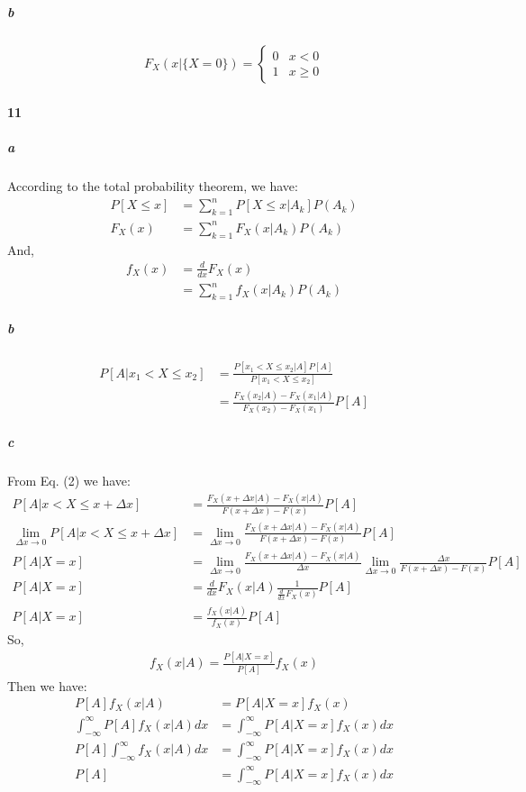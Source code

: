 \documentclass[22pt]{article}
\begin{document}
			\subparagraph{b}
			\begin{align}
				F_X(x|\{X=0\}) = 
				\begin{cases}
				0 & x< 0\\
				1 & x\geq0
				\end{cases}
			\end{align}

		\paragraph{11}
			\subparagraph{a} According to the total probability theorem, we have:
			\begin{align}
			P[X\leq x] & = \sum_{k=1}^{n}P[X\leq x|A_k]P(A_k)\\
			F_X(x) & = \sum_{k=1}^{n}F_X(x|A_k)P(A_k)
			\end{align}
			And, 
			\begin{align}
			f_X(x) &= \frac{d}{dx}F_X(x)\\
			& = \sum_{k=1}^{n}f_X(x|A_k)P(A_k)
			\end{align}

			\subparagraph{b}
			\begin{align}
			P[A|x_1<X\leq x_2] & = \frac{P[x_1<X\leq x_2|A]P[A]}{P[x_1<X\leq x_2]}\\
			& = \frac{F_X(x_2|A)-F_X(x_1|A)}{F_X(x_2)-F_X(x_1)}P[A]
			\end{align}

			\subparagraph{c}From Eq. (2) we have:
			\begin{align}
			P[A|x<X\leq x+\Delta x] &=\frac{F_X(x+\Delta x|A)-F_X(x|A)}{F(x+\Delta x)-F(x)}P[A] \\
			\lim_{\Delta x \rightarrow 0} P[A|x<X\leq x+\Delta x]& =\lim_{\Delta x \rightarrow 0} \frac{F_X(x+\Delta x|A)-F_X(x|A)}{F(x+\Delta x)-F(x)}P[A] \\
			P[A|X=x] & = \lim_{\Delta x \rightarrow 0}  \frac{F_X(x+\Delta x|A)-F_X(x|A)}{\Delta x}\lim_{\Delta x \rightarrow 0}\frac{\Delta x}{F(x+\Delta x)-F(x)}P[A]\\
			P[A|X=x] & = \frac{d}{dx} F_X(x|A)\frac{1}{\frac{d}{dx}F_X(x)}P[A]\\
			P[A|X=x] & = \frac{f_X(x|A)}{f_X(x)}P[A]
			\end{align}
			So, 
			\begin{align}
			f_X(x|A) = \frac{P[A|X=x]}{P[A]}f_X(x)
			\end{align}
			Then we have:
			\begin{align}
			P[A]f_X(x|A) & = P[A|X=x]f_X(x)\\
			\int_{-\infty}^{\infty} P[A]f_X(x|A) dx& =\int_{-\infty}^{\infty} P[A|X=x]f_X(x)dx\\
			P[A]\int_{-\infty}^{\infty} f_X(x|A) dx& =\int_{-\infty}^{\infty} P[A|X=x]f_X(x)dx\\
			P[A]& =\int_{-\infty}^{\infty} P[A|X=x]f_X(x)dx
			\end{align}
\end{document}
